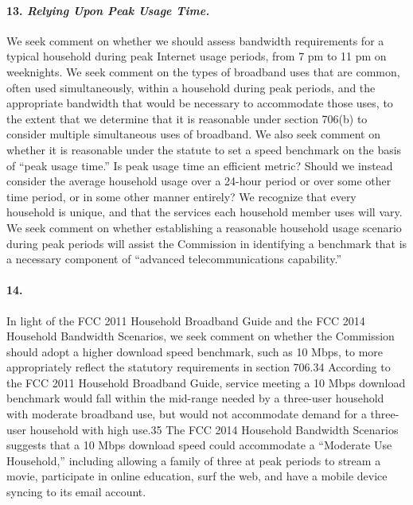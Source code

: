 \paragraph{13. \emph{Relying Upon Peak Usage Time.}}
 We seek comment on whether we should assess bandwidth requirements for a typical household during peak Internet usage periods, from 7 pm to 11 pm on weeknights.
We seek comment on the types of broadband uses that are common, often used simultaneously, within a household during peak periods, and the appropriate bandwidth that would be necessary to accommodate those uses, to the extent that we determine that it is reasonable under section 706(b) to consider multiple simultaneous uses of broadband. We also seek comment on whether it is reasonable under the statute to set a speed benchmark on the basis of ``peak usage time.'' Is peak usage time an efficient metric? Should we instead consider the average household usage over a 24-hour period or over some other time period, or in some other manner entirely? We recognize that every household is unique, and that the services each household member uses will vary. We seek comment on whether establishing a reasonable household usage scenario during peak periods will assist the Commission in identifying a benchmark that is a necessary component of ``advanced telecommunications capability.''

\paragraph{14. } In light of the FCC 2011 Household Broadband Guide and the FCC 2014 Household
Bandwidth Scenarios, we seek comment on whether the Commission should adopt a higher download speed benchmark, such as 10 Mbps, to more appropriately reflect the statutory requirements in section 706.34
According to the FCC 2011 Household Broadband Guide, service meeting a 10 Mbps download benchmark would fall within the mid-range needed by a three-user household with moderate broadband use, but would not accommodate demand for a three-user household with high use.35
The FCC 2014
Household Bandwidth Scenarios suggests that a 10 Mbps download speed could accommodate a ``Moderate Use Household,'' including allowing a family of three at peak periods to stream a movie, participate in online education, surf the web, and have a mobile device syncing to its email account.

